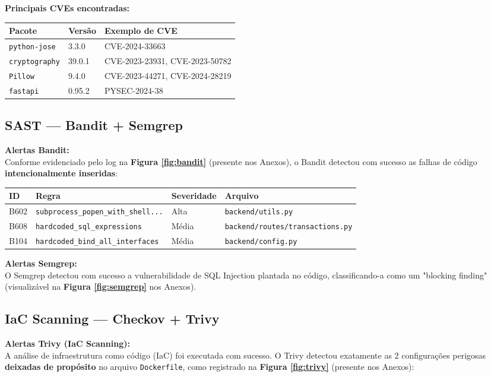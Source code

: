\documentclass[12pt,a4paper]{article}
\begin{document}
\textbf{Principais CVEs encontradas:}
\begin{table}[h]
\centering
\begin{tabular}{|l|l|l|}
\hline
\textbf{Pacote} & \textbf{Versão} & \textbf{Exemplo de CVE} \\ \hline
\texttt{python-jose} & 3.3.0 & CVE-2024-33663 \\ \hline
\texttt{cryptography} & 39.0.1 & CVE-2023-23931, CVE-2023-50782 \\ \hline
\texttt{Pillow} & 9.4.0 & CVE-2023-44271, CVE-2024-28219 \\ \hline
\texttt{fastapi} & 0.95.2 & PYSEC-2024-38 \\ \hline
\end{tabular}
\end{table}



\subsection{SAST — Bandit + Semgrep}
\textbf{Alertas Bandit:} \\
Conforme evidenciado pelo log na \textbf{Figura \ref{fig:bandit}} (presente nos Anexos), o Bandit detectou com sucesso as falhas de código \textbf{intencionalmente inseridas}:

\begin{table}[h]
\centering
\begin{tabular}{|l|l|l|l|}
\hline
\textbf{ID} & \textbf{Regra} & \textbf{Severidade} & \textbf{Arquivo} \\ \hline
B602 & \texttt{subprocess\_popen\_with\_shell...} & Alta & \texttt{backend/utils.py} \\ \hline
B608 & \texttt{hardcoded\_sql\_expressions} & Média & \texttt{backend/routes/transactions.py} \\ \hline
B104 & \texttt{hardcoded\_bind\_all\_interfaces} & Média & \texttt{backend/config.py} \\ \hline
\end{tabular}
\end{table}



\textbf{Alertas Semgrep:} \\
O Semgrep detectou com sucesso a vulnerabilidade de SQL Injection plantada no código, classificando-a como um "blocking finding" (visualizável na \textbf{Figura \ref{fig:semgrep}} nos Anexos).



\subsection{IaC Scanning — Checkov + Trivy}
\textbf{Alertas Trivy (IaC Scanning):} \\
A análise de infraestrutura como código (IaC) foi executada com sucesso. O Trivy detectou exatamente as 2 configurações perigosas \textbf{deixadas de propósito} no arquivo \texttt{Dockerfile}, como registrado na \textbf{Figura \ref{fig:trivy}} (presente nos Anexos):
\end{document}
